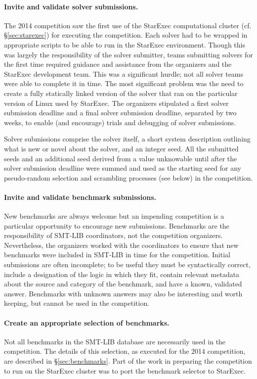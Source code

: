 \documentclass[twoside,11pt]{article}
\begin{document}
\paragraph{Invite and validate solver submissions.} The 2014 competition saw the first use of the StarExec computational cluster (cf. \S\ref{sec:starexec}) for executing the competition. Each solver had to be wrapped in appropriate scripts to be able to run in the StarExec environment. Though this was largely the responsibility of the solver submitter, teams submitting solvers for the first time required guidance and assistance from the organizers and the StarExec development team. This was a significant hurdle; not all solver teams were able to complete it in time. The most significant problem was the need to create a fully statically linked version of the solver that ran on the particular version of Linux used by StarExec. The organizers stipulated a first solver submission deadline and a final solver submission deadline, separated by two weeks, to enable (and encourage) trials and debugging of solver submissions.

Solver submissions comprise the solver itself, a short system description outlining what is new or novel about the solver, and an integer seed. All the submitted seeds and an additional seed derived from a value unknowable until after the solver submission deadline were summed and used as the starting seed for any pseudo-random selection and scrambling processes (see below) in the competition.

\paragraph{Invite and validate benchmark submissions.} New benchmarks are always welcome but an impending competition is a particular opportunity to encourage new submissions. Benchmarks are the responsibility of SMT-LIB coordinators, not the competition organizers. Nevertheless, the organizers worked with the coordinators to ensure that new benchmarks were included in SMT-LIB in time for the competition. Initial submissions are often incomplete; to be useful they must be syntactically correct, include a designation of the logic in which they fit, contain relevant metadata about the source and category of the benchmark, and have a known, validated answer. Benchmarks with unknown answers may also be interesting and worth keeping, but cannot be used in the competition.

\paragraph{Create an appropriate selection of benchmarks.} Not all benchmarks in the SMT-LIB database are necessarily used in the competition. The details of this selection, as executed for the 2014 competition, are described in \S\ref{sec:benchmarks}. Part of the work in preparing the competition to run on the StarExec cluster was to port the benchmark selector to StarExec.
\end{document}
